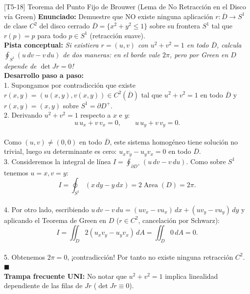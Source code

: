 \documentclass[11pt,a4paper]{article}
\begin{document}
\begin{ejerciciobox}{[T5-18] Teorema del Punto Fijo de Brouwer (Lema de No Retracción en el Disco vía Green)}
\textbf{Enunciado:} Demuestre que NO existe ninguna aplicación $r: \overline{D} \to S^1$ de clase $C^2$ del disco cerrado $\overline{D} = \{x^2+y^2 \le 1\}$ sobre su frontera $S^1$ tal que $r(p) = p$ para todo $p \in S^1$ (retracción suave).\\[0.2cm]
\textbf{Pista conceptual:} \emph{Si existiera $r = (u, v)$ con $u^2 + v^2 = 1$ en todo $\overline{D}$, calcula $\oint_{S^1} (u\,dv - v\,du)$ de dos maneras: en el borde vale $2\pi$, pero por Green en $D$ depende de $\det Jr = 0$!}\\[0.2cm]
\textbf{Desarrollo paso a paso:}\\
1. Supongamos por contradicción que existe $r(x,y) = (u(x,y), v(x,y)) \in C^2(\overline{D})$ tal que $u^2 + v^2 = 1$ en todo $\overline{D}$ y $r(x,y) = (x,y)$ sobre $S^1 = \partial D^+$.\\
2. Derivando $u^2 + v^2 = 1$ respecto a $x$ e $y$:\\
$$u\,u_x + v\,v_x = 0, \qquad u\,u_y + v\,v_y = 0.$$\\
Como $(u,v) \neq (0,0)$ en todo $\overline{D}$, este sistema homogéneo tiene solución no trivial, luego su determinante es cero: $u_x v_y - u_y v_x = 0$ en todo $\overline{D}$.\\
3. Consideremos la integral de línea $I = \oint_{\partial D^+} (u\,dv - v\,du)$. Como sobre $S^1$ tenemos $u=x, v=y$:\\
$$I = \oint_{S^1} (x\,dy - y\,dx) = 2\operatorname{Area}(D) = 2\pi.$$\\
4. Por otro lado, escribiendo $u\,dv - v\,du = (u v_x - v u_x)\,dx + (u v_y - v u_y)\,dy$ y aplicando el Teorema de Green en $D$ ($r \in C^2$, cancelación por Schwarz):\\
$$I = \iint_D 2(u_x v_y - u_y v_x)\,dA = \iint_D 0\,dA = 0.$$\\
5. Obtenemos $2\pi = 0$, ¡contradicción! Por tanto no existe ninguna retracción $C^2$. $\blacksquare$\\[0.2cm]
\textbf{Trampa frecuente UNI:} No notar que $u^2+v^2=1$ implica linealidad dependiente de las filas de $Jr$ ($\det Jr \equiv 0$).
\end{ejerciciobox}
\end{document}
